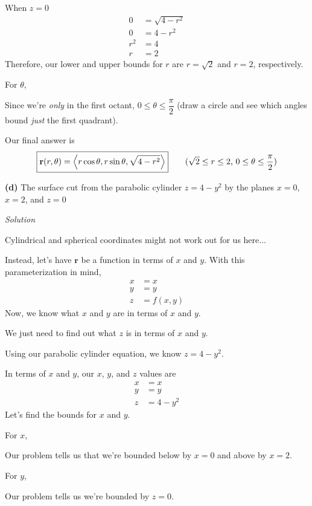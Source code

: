 \documentclass{article}
\newcommand{\lra}[1]{\left\langle #1 \right\rangle}
\renewcommand{\r}[0]{\mathbf{r}}
\newcommand{\Solution}{\textit{Solution}}
\begin{document}
When $z=0$
\begin{align*}
    0&=\sqrt{4-r^2}\\
    0&=4-r^2\\
    r^2&=4\\
    r&=2\tag{$r\geq 0$ is always true}
\end{align*}
Therefore, our lower and upper bounds for $r$ are $r=\sqrt{2}$ and $r=2$, respectively.

For $\theta$,

Since we're \textit{only} in the first octant, $0\leq \theta\leq \dfrac{\pi}{2}$ (draw a circle and see which angles bound \textit{just} the first quadrant).

Our final answer is
\begin{equation*}
    \boxed{\r(r,\theta)=\lra{r\cos\theta, r\sin\theta, \sqrt{4-r^2}}}\tag{$\sqrt{2}\leq r\leq 2$, $0\leq \theta\leq \dfrac{\pi}{2}$}
\end{equation*}
{}\textbf{(d)} The surface cut from the parabolic cylinder $z=4-y^2$ by the planes $x=0$, $x=2$, and $z=0$

\Solution

Cylindrical and spherical coordinates might not work out for us here...

Instead, let's have $\r$ be a function in terms of $x$ and $y$. With this parameterization in mind,
\begin{align*}
    x&=x\\
    y&=y\\
    z&=f(x,y)
\end{align*}
Now, we know what $x$ and $y$ are in terms of $x$ and $y$.

We just need to find out what $z$ is in terms of $x$ and $y$.

Using our parabolic cylinder equation, we know $z=4-y^2$.

In terms of $x$ and $y$, our $x$, $y$, and $z$ values are
\begin{align*}
    x&=x\\
    y&=y\\
    z&=4-y^2
\end{align*}
Let's find the bounds for $x$ and $y$.

For $x$,

Our problem tells us that we're bounded below by $x=0$ and above by $x=2$.

For $y$,

Our problem tells us we're bounded by $z=0$. 
\end{document}
